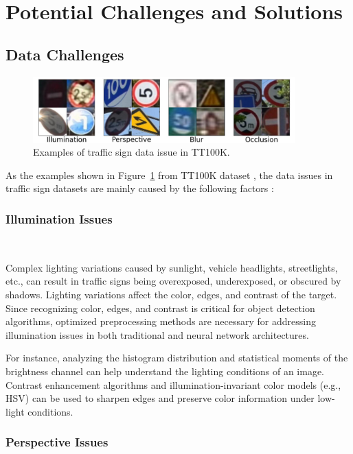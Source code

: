 \documentclass[letterpaper, 10 pt, conference]{ieeeconf}
\begin{document}
\
\section{Potential Challenges and Solutions}
\hrulefill

\subsection{Data Challenges}

\begin{figure}[!t]
    \centering
    \includegraphics[width=0.9\textwidth]{figures/TT100K_bad_datas.jpg} 
    \caption{Examples of traffic sign data issue in TT100K.}
    \label{fig:data_issue}
\end{figure}

As the examples shown in Figure~\ref{fig:data_issue} from TT100K dataset \cite{Zhe_2016_CVPR}, the data issues in traffic sign datasets are mainly caused by the following factors \cite{9072976}:

\subsubsection{Illumination Issues}\

Complex lighting variations caused by sunlight, vehicle headlights, streetlights, etc., can result in traffic signs being overexposed, underexposed, or obscured by shadows. Lighting variations affect the color, edges, and contrast of the target. Since recognizing color, edges, and contrast is critical for object detection algorithms, optimized preprocessing methods are necessary for addressing illumination issues in both traditional and neural network architectures.

For instance, analyzing the histogram distribution and statistical moments of the brightness channel can help understand the lighting conditions of an image. Contrast enhancement algorithms and illumination-invariant color models (e.g., HSV) can be used to sharpen edges and preserve color information under low-light conditions.

\subsubsection{Perspective Issues}\
\end{document}
